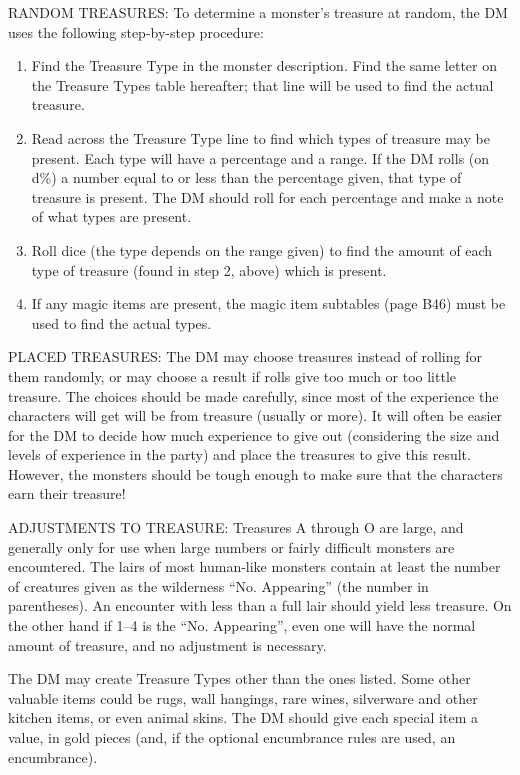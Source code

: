 \documentclass[letterpaper,serif,tightsqueeze]{module}
\newcommand{\threequarters}{{\usefont{T1}{lmr}{m}{n}\sfrac{3}{4}} }
\begin{document}
RANDOM TREASURES: To determine a monster's treasure at
random, the DM uses the following step-by-step procedure:
\begin{enumerate}
\item Find the Treasure Type in the monster description. Find the
same letter on the Treasure Types table hereafter; that
line will be used to find the actual treasure.
\item Read across the Treasure Type line to find which types of
treasure may be present. Each type will have a percentage
and a range. If the DM rolls (on d\%) a number equal to or
less than the percentage given, that type of treasure is
present. The DM should roll for each percentage and
make a note of what types are present.
\item Roll dice (the type depends on the range given) to find the
amount of each type of treasure (found in step 2, above) which is present.
\item If any magic items are present, the magic item subtables (page B46)
must be used to find the actual types.
\end{enumerate}

PLACED TREASURES: The DM may choose treasures instead of
rolling for them randomly, or may choose a result if rolls give too
much or too little treasure. The choices should be made carefully,
since most of the experience the characters will get will be from
treasure (usually \threequarters or more). It will often be easier for the DM to
decide how much experience to give out (considering the size and
levels of experience in the party) and place the treasures to give
this result. However, the monsters should be tough enough to
make sure that the characters earn their treasure!

ADJUSTMENTS TO TREASURE: Treasures A through O are
large, and generally only for use when large numbers or fairly difficult
monsters are encountered. The lairs of most human-like
monsters contain at least the number of creatures given as the
wilderness ``No. Appearing'' (the number in parentheses). An encounter
with less than a full lair should yield less treasure. On the
other hand if 1--4 is the ``No. Appearing'', even one will have the
normal amount of treasure, and no adjustment is necessary.

The DM may create Treasure Types other than the ones listed.
Some other valuable items could be rugs, wall hangings, rare
wines, silverware and other kitchen items, or even animal skins.
The DM should give each special item a value, in gold pieces (and,
if the optional encumbrance rules are used, an encumbrance).
\end{document}
